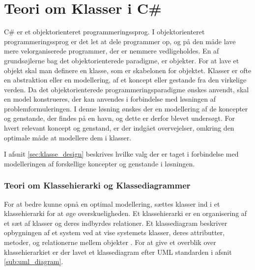 \section{Teori om Klasser i C\#}
\label{sec:klasse_teori}

C\# er et objektorienteret programmeringssprog. I objektorienteret programmeringssprog er det let at dele programmer op, og på den måde lave mere velorganiserede programmer, der er nemmere vedligeholdes. En af grundsøjlerne bag det objektorienterede paradigme, er objekter. For at lave et objekt skal man definere en klasse, som er skabelonen for objektet. Klasser er ofte en abstraktion eller en modellering, af et koncept eller gestande fra den virkelige verden. Da det objektorienterede programmeringsparadigme ønskes anvendt, skal en model konstrueres, der kan anvendes i forbindelse med løsningen af problemformuleringen. I denne løsning ønskes der en modellering af de koncepter og genstande, der findes på en havn, og dette er derfor blevet undersøgt. For hvert relevant koncept og genstand, er der indgået overvejelser, omkring den optimale måde at modellere dem i klasser.

I afsnit \cref{sec:klasse_design} beskrives hvilke valg der er taget i forbindelse med modelleringen af forskellige koncepter og genstande i løsningen.

\subsubsection{Teori om Klassehierarki og Klassediagrammer}
\label{sub:uml_teori}

For at bedre kunne opnå en optimal modellering, sættes klasser ind i et klassehierarki for at øge overskueligheden. Et klassehierarki er en organisering af et sæt af klasser og deres indbyrdes relationer. Et klassediagram beskriver opbygningen af et system ved at vise systemets klasser, deres attributter, metoder, og relationerne mellem objekter \cite{martin2006agile}. For at give et overblik over klassehierarkiet er der lavet et klassediagram efter UML standarden i afsnit \cref{sub:uml_diagram}.